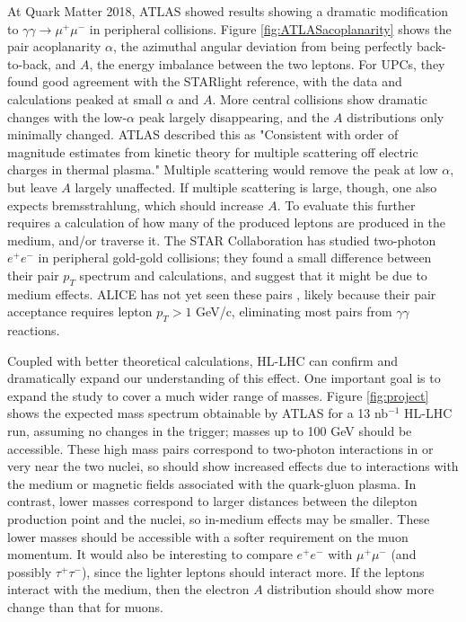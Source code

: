 \documentclass[../report.tex]{subfiles}
\begin{document}
At Quark Matter 2018, ATLAS  \cite{QM2018:presentation:AaronAngerami}  showed results showing a dramatic modification to $\gamma\gamma\rightarrow\mu^+\mu^-$ in peripheral collisions.  Figure \ref{fig:ATLASacoplanarity} shows the pair acoplanarity $\alpha$, the azimuthal angular deviation from being perfectly back-to-back, and $A$, the energy imbalance between the two leptons.  For UPCs, they found good agreement with the STARlight \cite{Baltz:2009jk,Klein:2016yzr} reference, with the data and calculations peaked at small $\alpha$ and $A$.   More central collisions show dramatic changes with the low-$\alpha$ peak largely disappearing, and the $A$ distributions only minimally changed.  ATLAS described this as "Consistent with order of magnitude estimates from kinetic theory for multiple scattering off electric charges in thermal plasma."  Multiple scattering would remove the peak at low $\alpha$, but leave $A$ largely unaffected.  If multiple scattering is large, though, one also expects bremsstrahlung, which should increase $A$.   To evaluate this further requires a calculation of how many of the produced leptons are produced in the medium, and/or traverse it.  The STAR Collaboration has studied two-photon $e^+e^-$ in peripheral gold-gold collisions; they found a small difference between their pair $p_T$ spectrum and calculations, and suggest that it might be due to medium effects\cite{Adam:2018tdm}.    ALICE has not yet seen these pairs \cite{Adam:2015gba}, likely because their pair acceptance requires  lepton $p_T > 1$ GeV/c, eliminating most pairs from $\gamma\gamma$ reactions. 

Coupled with better theoretical calculations, HL-LHC can confirm and dramatically expand our understanding of this effect.   One important goal is to expand the study to cover a much wider range of masses.  Figure \ref{fig:project} shows the expected mass spectrum obtainable by ATLAS for a 13 nb$^{-1}$ HL-LHC run, assuming no changes in the trigger; masses up to 100 GeV should be accessible. These high mass pairs correspond to two-photon interactions in or very near the two nuclei, so should show increased effects due to interactions with the medium or magnetic fields associated with the quark-gluon plasma. In contrast, lower masses correspond to larger distances between the dilepton production point and the nuclei, so in-medium effects may be smaller.  These lower masses should be accessible with a softer requirement on the muon momentum.   It would also be interesting to compare $e^+e^-$ with $\mu^+\mu^-$ (and possibly $\tau^+\tau^-$), since the lighter leptons should interact more.  If the leptons interact with the medium, then the electron $A$ distribution should show more change than that for muons.  
\end{document}
